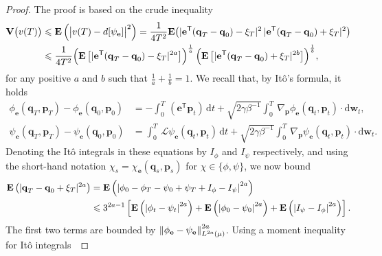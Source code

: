 \documentclass[11pt,a4paper]{article}
\newcommand{\expect}[0]{\mathbf{E}}
\newcommand{\var}[0]{\mathbf{V}}
\newcommand{\grad}{\nabla}
\newcommand{\vect}[1]{\boldsymbol{\mathbf #1}}
\renewcommand{\d}{\mathrm d}
\renewcommand{\t}{\mathsf T}
\theoremstyle{plain}
\numberwithin{equation}{section}
\renewcommand{\leq}{\leqslant}
\begin{document}
\begin{proof}
    The proof is based on the crude inequality
    \begin{align}
        \notag
        \var \bigl(v(T)\bigr)
        &\leq \expect \left( \bigl\lvert v(T) - d[\psi_{\vect e}] \bigr\rvert^2 \right)
        = \frac{1}{4 T^2} \expect \big( \lvert \vect e^\t (\vect q_T - \vect q_0) - \xi_T \rvert^2 \, \lvert \vect e^\t (\vect q_T - \vect q_0) + \xi_T \rvert^2 \big) \\
        \label{eq:bound_variance_two_factors}
        &\leq \frac{1}{4 T^2}
        {\Bigl(\expect \left[  \lvert \vect e^\t(\vect q_T - \vect q_0) - \xi_T \rvert^{2a} \right]\Bigr)^{\frac{1}{a}}} \,
        {\Bigl(\expect \left[ \lvert \vect e^\t (\vect q_T - \vect q_0) + \xi_T \rvert^{2b} \right]\Bigr)^{\frac{1}{b}}},
    \end{align}
    for any positive $a$ and $b$ such that $\frac{1}{a} + \frac{1}{b} = 1$.
    We recall that, by It\^o's formula, it holds
    \begin{align*}
        \phi_{\vect e}(\vect q_T, \vect p_T) - \phi_{\vect e}(\vect q_0, \vect p_0)
        &= - \int_{0}^{T} \, (\vect e^\t \vect p_t) \, \d t + \sqrt{2 \gamma \beta^{-1}} \int_{0}^{T} \, \grad_{\vect p} \phi_{\vect e} (\vect q_t, \vect p_t) \cdot \d \vect w_t, \\
        \psi_{\vect e}(\vect q_T, \vect p_T) - \psi_{\vect e}(\vect q_0, \vect p_0)
        &= \int_{0}^{T} \, \mathcal L \psi_{\vect e}(\vect q_t, \vect p_t) \, \d t + \sqrt{2 \gamma \beta^{-1}} \int_{0}^{T} \, \grad_{\vect p} \psi_{\vect e} (\vect q_t, \vect p_t) \cdot \d \vect w_t.
    \end{align*}
    Denoting the It\^o integrals in these equations by $I_{\phi}$ and $I_{\psi}$ respectively,
    and using the short-hand notation $\chi_{s} = \chi_{\vect e}(\vect q_s, \vect p_s)$ for $\chi \in \{\phi, \psi\}$,
    we now bound
    \begin{align*}
        \expect \left( |\vect q_T - \vect q_0 + \xi_T|^{2 a} \right)
        &= \expect \left( \abs{\phi_{0} - \phi_{T} - \psi_{0} + \psi_{T}  + I_{\phi} - I_{\psi}}^{2 a} \right) \\
        &\leq 3^{2 a-1} \left[ \expect \left( \abs{\phi_t - \psi_t}^{2 a} \right) + \expect \left( \abs{\phi_0 - \psi_0}^{2 a} \right) + \expect \left( \abs{I_{\psi} - I_{\phi}}^{2 a} \right) \right].
    \end{align*}
    The first two terms are bounded by $\norm{\phi_{\vect e} - \psi_{\vect e}}_{L^{2 a}(\mu)}^{2 a}$.
    Using a moment inequality for It\^o integrals~\cite[Theorem 7.1]{MR2380366}

\end{proof}
\end{document}

